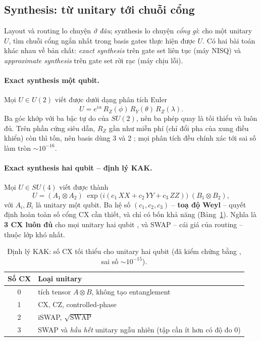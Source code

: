 \subsection{Synthesis: từ unitary tới chuỗi cổng}
\label{sec:synthesis}

Layout và routing lo chuyện \emph{ở đâu}; synthesis lo chuyện \emph{cổng gì}: cho một unitary $U$,
tìm chuỗi cổng ngắn nhất trong basis gates thực hiện được $U$. Có hai bài toán khác nhau về bản chất:
\emph{exact synthesis} trên gate set liên tục (máy NISQ) và \emph{approximate synthesis} trên gate set
rời rạc (máy chịu lỗi).

\paragraph{Exact synthesis một qubit.} Mọi $U\in U(2)$ viết được dưới dạng phân tích Euler
\begin{equation}
  U = e^{i\alpha}\,R_Z(\phi)\,R_Y(\theta)\,R_Z(\lambda).
\end{equation}
Ba góc khớp với ba bậc tự do của $SU(2)$, nên ba phép quay là tối thiểu và luôn đủ. Trên phần cứng
siêu dẫn, $R_Z$ gần như miễn phí (chỉ đổi pha của xung điều khiển) còn  thì tốn, nên basis
 dùng 3  và 2 ; mọi phân tích đều chính xác tới sai số làm tròn
$\sim10^{-16}$.

\paragraph{Exact synthesis hai qubit -- định lý KAK.} Mọi $U\in SU(4)$ viết được thành
\cite{khaneja2001cartan, vatan2004optimal}
\begin{equation}
  U = (A_1\otimes A_2)\; \exp\!\big(i(c_1\,XX + c_2\,YY + c_3\,ZZ)\big)\; (B_1\otimes B_2),
\end{equation}
với $A_i, B_i$ là unitary một qubit. Ba hệ số $(c_1,c_2,c_3)$ -- \textbf{toạ độ Weyl} -- quyết định
hoàn toàn số cổng CX cần thiết, và chỉ có bốn khả năng (Bảng~\ref{tab:kak}). Nghĩa là
\textbf{3 CX luôn đủ} cho mọi unitary hai qubit \cite{vatan2004optimal}, và SWAP -- cái giá của routing
-- thuộc lớp khó nhất.

\begin{table}[h]
  \centering
  \caption{Định lý KAK: số CX tối thiểu cho unitary hai qubit (đã kiểm chứng bằng
  , sai số $\sim10^{-15}$).}
  \label{tab:kak}
  \small
  \begin{tabular}{@{}cl@{}}
    \toprule
    \textbf{Số CX} & \textbf{Loại unitary} \\
    \midrule
    0 & tích tensor $A\otimes B$, không tạo entanglement \\
    1 & CX, CZ, controlled-phase \\
    2 & iSWAP, $\sqrt{\mathrm{SWAP}}$ \\
    3 & SWAP và \emph{hầu hết} unitary ngẫu nhiên (tập cần ít hơn có độ đo 0) \\
    \bottomrule
  \end{tabular}
\end{table}

